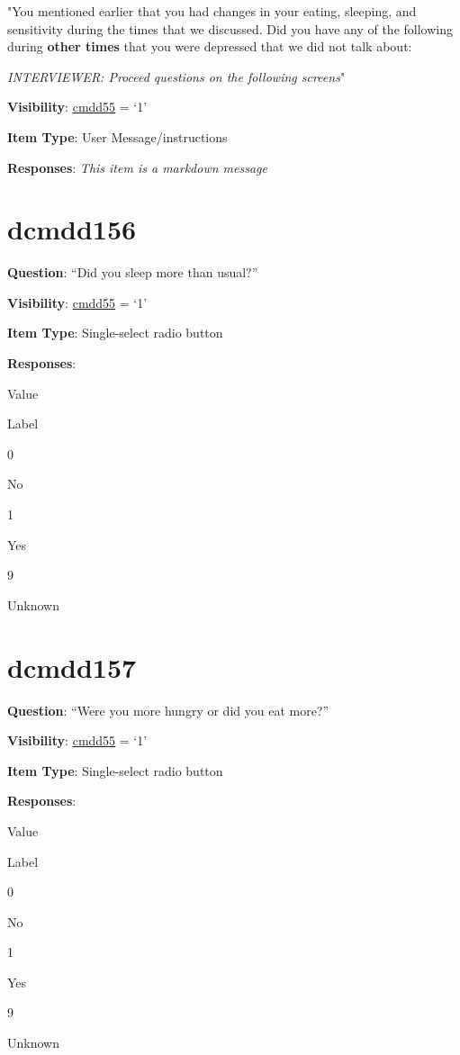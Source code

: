\documentclass[]{book}
\begin{document}
"You mentioned earlier that you had changes in your eating, sleeping, and sensitivity during the times that we discussed. Did you have any of the following during \textbf{other times} that you were depressed that we did not talk about:

\emph{INTERVIEWER: Proceed questions on the following screens}"

\textbf{Visibility}: \protect\hyperlink{cmdd55}{cmdd55} = `1'

\textbf{Item Type}: User Message/instructions

\textbf{Responses}: \emph{This item is a markdown message}

\hypertarget{dcmdd156}{%
\section{dcmdd156}\label{dcmdd156}}

\textbf{Question}: ``Did you sleep more than usual?''

\textbf{Visibility}: \protect\hyperlink{cmdd55}{cmdd55} = `1'

\textbf{Item Type}: Single-select radio button

\textbf{Responses}:

Value

Label

0

No

1

Yes

9

Unknown

\hypertarget{dcmdd157}{%
\section{dcmdd157}\label{dcmdd157}}

\textbf{Question}: ``Were you more hungry or did you eat more?''

\textbf{Visibility}: \protect\hyperlink{cmdd55}{cmdd55} = `1'

\textbf{Item Type}: Single-select radio button

\textbf{Responses}:

Value

Label

0

No

1

Yes

9

Unknown
\end{document}
